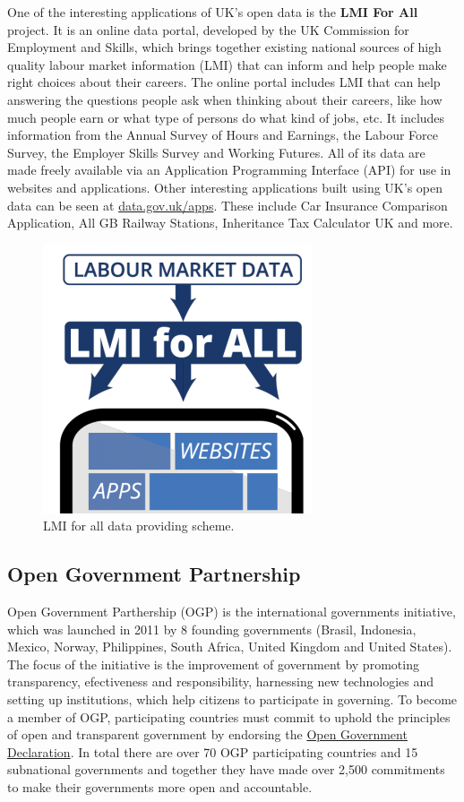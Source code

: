 \documentclass[thesis=B,english]{FITthesis}[2012/06/26]
\begin{document}
One of the interesting applications of UK's open data is the \textbf{LMI For All} project. It is an online data portal, developed by the UK Commission for Employment and Skills, which brings together existing national sources of high quality labour market information (LMI) that can inform and help people make right choices about their careers. The online portal includes LMI that can help answering the questions people ask when thinking about their careers, like how much people earn or what type of persons do what kind of jobs, etc. It includes information from the Annual Survey of Hours and Earnings, the Labour Force Survey, the Employer Skills Survey and Working Futures. All of its data are made freely available  via an Application Programming Interface (API) for use in websites and applications. \linebreak
Other interesting applications built using UK's open data can be seen at \href{https://data.gov.uk/apps}{data.gov.uk/apps}. These include Car Insurance Comparison Application, All GB Railway Stations, Inheritance Tax Calculator UK and more.
	\begin{figure}[h!]
		\centering
		\includegraphics[scale=0.5]{pictures/LMIForAll.png}
  		\caption{LMI for all data providing scheme. \cite{lmiforall}}
  		\label{fig:LMI for all}
	\end{figure}

	\subsection{Open Government Partnership}
	Open Government Parthership (OGP) is the international governments initiative, which was launched in 2011 by 8 founding governments (Brasil, Indonesia, Mexico, Norway, Philippines, South Africa, United Kingdom and United States). The focus of the initiative is the improvement of government by promoting transparency, efectiveness and responsibility, harnessing new technologies and setting up institutions, which help citizens to participate in governing. To become a member of OGP, participating countries must commit to uphold the principles of open and transparent government by endorsing the \href{https://www.opengovpartnership.org/open-government-declaration}{Open Government Declaration}. In total there are over 70 OGP participating countries and 15 subnational governments and together they have made over 2,500 commitments to make their governments more open and accountable. \cite{opengovernmentpartnership}
	
\end{document}
